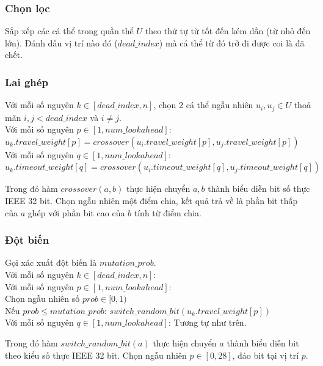 \documentclass[12pt]{report}
\begin{document}
\subsubsection{Chọn lọc}
Sắp xếp các cá thể trong quần thể $U$ theo thứ tự từ tốt đến kém dần (từ nhỏ đến lớn). Đánh dấu vị trí nào đó ($dead\_index$) mà cá thể từ đó trở đi được coi là đã chết. 
\subsubsection{Lai ghép} 
Với mỗi số nguyên $k \in [dead\_index, n]$, chọn 2 cá thể ngẫu nhiên $u_i, u_j \in U$ thoả mãn $i, j < dead\_index$ và $i \neq j$.  \\
Với mỗi số nguyên $p \in [1,num\_lookahead]$: \\
\hspace*{1cm}$u_k.travel\_weight[p] = crossover(u_i.travel\_weight[p], u_j.travel\_weight[p])$  \\
Với mỗi số nguyên $q \in [1, num\_lookahead]$: \\
\hspace*{1cm}$u_k.timeout\_weight[q] = crossover(u_i.timeout\_weight[q], u_j.timeout\_weight[q])$ 

Trong đó hàm $crossover(a, b)$ thực hiện chuyển $a, b$ thành biểu diễn bit số thực IEEE 32 bit. Chọn ngẫu nhiên một điểm 
chia, kết quả trả về là phần bit thấp của $a$ ghép với phần bit cao của $b$ tính từ điểm chia. 
\subsubsection{Đột biến}
Gọi xác xuất đột biến là $mutation\_prob$. \\
Với mỗi số nguyên $k \in [dead\_index, n]$:	\\
\hspace*{1cm}Với mỗi số nguyên $p \in [1,num\_lookahead]$:	\\
\hspace*{2cm}Chọn ngẫu nhiên số $prob \in [0, 1)$ 	\\
\hspace*{2cm}Nếu $prob \leq mutation\_prob$: $switch\_random\_bit(u_k.travel\_weight[p])$	\\
\hspace*{1cm}Với mỗi số nguyên $q \in [1, num\_lookahead]$: Tương tự như trên. 

Trong đó hàm $switch\_random\_bit(a)$ thực hiện chuyển $a$ thành biểu diễn bit theo kiểu số thực IEEE 32 bit. Chọn ngẫu nhiên $p \in [0, 28]$, đảo bit tại vị trí $p$. 
\end{document}
